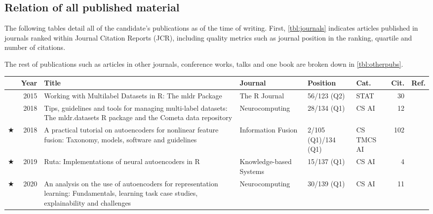 \subsection{Relation of all published material}

The following tables detail all of the candidate's publications as of the time of writing. First, \autoref{tbl:journals} indicates articles published in journals ranked within Journal Citation Reports (JCR), including quality metrics such as journal position in the ranking, quartile and number of citations. 

The rest of publications such as articles in other journals, conference works, talks and one book are broken down in \autoref{tbl:otherpubs}.

\begin{table*}[htbp]\scriptsize
    \begin{tabular}{crp{5.5cm}p{3cm}p{1.6cm}p{0.9cm}rc}
        \toprule
        & Year & Title & Journal & Position & Cat. & Cit. & Ref. \\
        \midrule
        & 2015
        &  Working with Multilabel Datasets in R: The mldr Package 
        & The R Journal
        & 56/123 (Q2) & STAT & 30 & \cite{mldr} \\

        & 2018
        &  Tips, guidelines and tools for managing multi-label datasets: The mldr.datasets R package and the Cometa data repository 
        & Neurocomputing
        & 28/134 (Q1) & CS AI & 12 & \cite{cometa} \\

        $\bigstar$ & 2018 
        & A practical tutorial on autoencoders for nonlinear feature fusion: Taxonomy, models, software and guidelines 
        & Information Fusion
        & 
        {2/105 (Q1)\newline 3/134 (Q1)}
        & 
        {CS TM\newline CS AI}
        & 102 & \cite{INFFUS18-AutoencoderTutorial} \\

        $\bigstar$ & 2019 
        & Ruta: Implementations of neural autoencoders in R  
        & Knowledge-based Systems
        & 15/137 (Q1) & CS AI & 4 & \cite{charte2019ruta} \\
        
        $\bigstar$ & 2020 
        &  An analysis on the use of autoencoders for representation learning: Fundamentals, learning task case studies, explainability and challenges 
        & Neurocomputing
        & 30/139 (Q1) & CS AI & 11 & \cite{charte2020analysis} \\


\end{tabular}
\end{table*}
